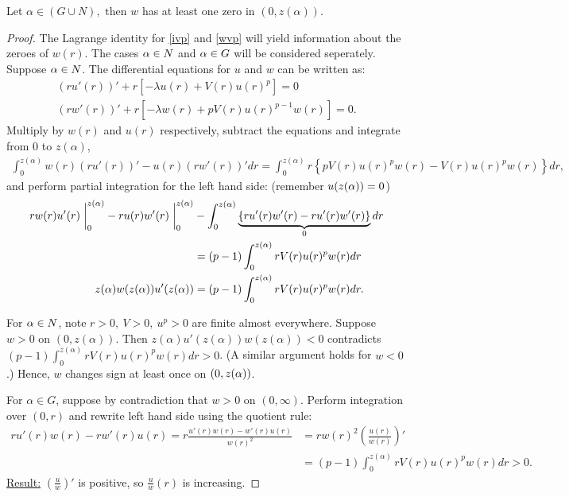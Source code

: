 \newpage
\begin{lemma}Let $\alpha\in (G\cup N),\text{ then }w$ has at least one zero in $(0,z(\alpha))$.
\begin{proof}
The Lagrange identity for \ref{ivp} and \ref{wvp} will yield information about the zeroes of $w(r)$.
The cases $\alpha\in N$ and $\alpha\in G$ will be considered seperately.
Suppose $\alpha\in N$.
The differential equations for $u$ and $w$ can be written as:
\begin{gather*}
  (ru'(r))'+r\left[-\lambda u(r)+V(r)u(r)^p\right]=0\\
  (rw'(r))'+r\left[-\lambda w(r)+pV(r)u(r)^{p-1}w(r)\right]=0.
\end{gather*}
Multiply by $w(r)$ and $u(r)$ respectively, subtract the equations and integrate from 0 to $z(\alpha)$,
\begin{gather*}
  \int_0^{z(\alpha)}w(r)(ru'(r))'-u(r)(rw'(r))'dr=%
  \int_0^{z(\alpha)}r\left\{pV(r)u(r)^pw(r)-V(r)u(r)^pw(r)\right\}dr,
\end{gather*}
and perform partial integration for the left hand side: (remember $u(z(\alpha))=0$)
\begin{align*}
  rw(r)u'(r)\at_0^{z(\alpha)}-ru(r)w'(r)\at_0^{z(\alpha)}&-
  \int_0^{z(\alpha)}\underbrace{\{ru'(r)w'(r)-ru'(r)w'(r)\}}_0dr\\
  &=(p-1)\int_0^{z(\alpha)}rV(r)u(r)^pw(r)dr\\
  z(\alpha)w(z(\alpha))u'(z(\alpha))&=(p-1)\int_0^{z(\alpha)}rV(r)u(r)^pw(r)dr.
\end{align*}


For $\alpha\in N$, note $r>0,~V>0,~u^p>0$ are finite almost everywhere.
Suppose $w>0$ on $(0,z(\alpha))$.
Then $z(\alpha)u'(z(\alpha))w(z(\alpha))<0$ contradicts
$(p-1)\int_0^{z(\alpha)}rV(r)u(r)^pw(r)dr>0$.
(A similar argument holds for $w<0$.)
Hence, $w$ changes sign at least once on $(0,z(\alpha))$.

For $\alpha\in G$, suppose by contradiction that $w>0$ on $(0,\infty)$.
Perform integration over $(0,r)$ and rewrite left hand side using the quotient rule:
\begin{align*}
ru'(r)w(r)-rw'(r)u(r)
=r\frac{u'(r)w(r)-w'(r)u(r)}{w(r)^2}
&=rw(r)^2\left(\frac{u(r)}{w(r)}\right)'\\
&=(p-1)\int_0^{z(\alpha)}rV(r)u(r)^pw(r)dr>0.
\end{align*}
\underline{Result:} $\left(\frac{u}{w}\right)'$ is positive, so $\frac{u}{w}(r)$ is increasing.


\end{proof}
\end{lemma}
